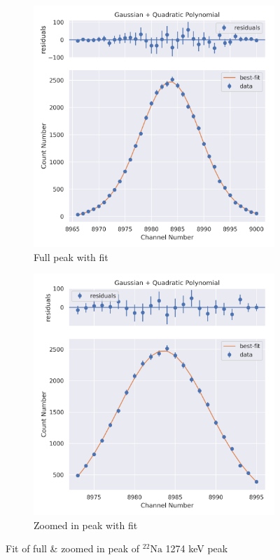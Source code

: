 \documentclass[11pt,a4paper]{article}
\newcommand{\element}[2]{$^{#2}\textrm{#1}$}
\begin{document}
\begin{figure}[H]
  \centering
  \begin{subfigure}{.5\linewidth}
    \centering
    \includegraphics[width=\linewidth]{./Images/Sodium22/Quad/Quad_2_Full.png}
    \caption{Full peak with fit}
  \end{subfigure}%
  \begin{subfigure}{.5\linewidth}
    \centering
    \includegraphics[width=\linewidth]{./Images/Sodium22/Quad/Quad_2_Zoom.png}
    \caption{Zoomed in peak with fit}
  \end{subfigure}
  \caption{Fit of full \& zoomed in peak of \element{Na}{22} 1274 keV peak}
\end{figure}
\end{document}
